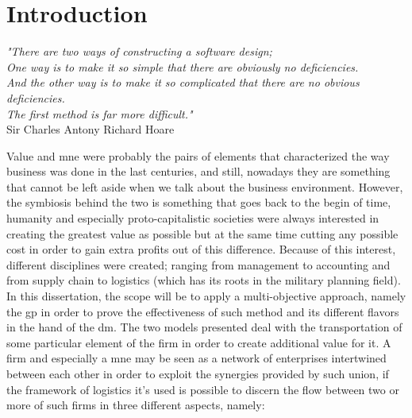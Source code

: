 \clearpage{\pagestyle{empty}\cleardoublepage}
\chapter*{Introduction}
\begin{doublespace}

\begin{flushright}\begin{small}\textit{"There are two ways of constructing a software design;\\One way is to make it so simple that there are obviously no deficiencies.\\And the other way is to make it so complicated that there are no obvious deficiencies.\\The first method is far more difficult."}\\
Sir Charles Antony Richard Hoare\\
\end{small}\end{flushright}

Value and \gls{mne} were probably the pairs of elements that characterized the way business was done in the last centuries, and still, nowadays they are something that cannot be left aside when we talk about the business environment. However, the symbiosis behind the two is something that goes back to the begin of time, humanity and especially proto-capitalistic societies were always interested in creating the greatest value as possible but at the same time cutting any possible cost in order to gain extra profits out of this difference. Because of this interest, different disciplines were created; ranging from management to accounting and from supply chain to logistics (which has its roots in the military planning field). In this dissertation, the scope will be to apply a multi-objective approach, namely the \gls{gp} in order to prove the effectiveness of such method and its different flavors in the hand of the \gls{dm}. The two models presented deal with the transportation of some particular element of the firm in order to create additional value for it. A firm and especially a \gls{mne} may be seen as a network of enterprises intertwined between each other in order to exploit the synergies provided by such union, if the framework of logistics it's used is possible to discern the flow between two or more of such firms in three different aspects, namely:


\end{doublespace}
